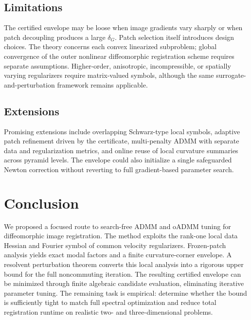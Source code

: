 \documentclass[11pt]{article}
\theoremstyle{definition}
\begin{document}
\subsection{Limitations}
The certified envelope may be loose when image gradients vary sharply or when patch decoupling produces a large $\delta_G$. Patch selection itself introduces design choices. The theory concerns each convex linearized subproblem; global convergence of the outer nonlinear diffeomorphic registration scheme requires separate assumptions. Higher-order, anisotropic, incompressible, or spatially varying regularizers require matrix-valued symbols, although the same surrogate-and-perturbation framework remains applicable.

\subsection{Extensions}
Promising extensions include overlapping Schwarz-type local symbols, adaptive patch refinement driven by the certificate, multi-penalty ADMM with separate data and regularization metrics, and online reuse of local curvature summaries across pyramid levels. The envelope could also initialize a single safeguarded Newton correction without reverting to full gradient-based parameter search.

\section{Conclusion}
We proposed a focused route to search-free ADMM and oADMM tuning for diffeomorphic image registration. The method exploits the rank-one local data Hessian and Fourier symbol of common velocity regularizers. Frozen-patch analysis yields exact modal factors and a finite curvature-corner envelope. A resolvent perturbation theorem converts this local analysis into a rigorous upper bound for the full noncommuting iteration. The resulting certified envelope can be minimized through finite algebraic candidate evaluation, eliminating iterative parameter tuning. The remaining task is empirical: determine whether the bound is sufficiently tight to match full spectral optimization and reduce total registration runtime on realistic two- and three-dimensional problems.

\appendix
\end{document}
